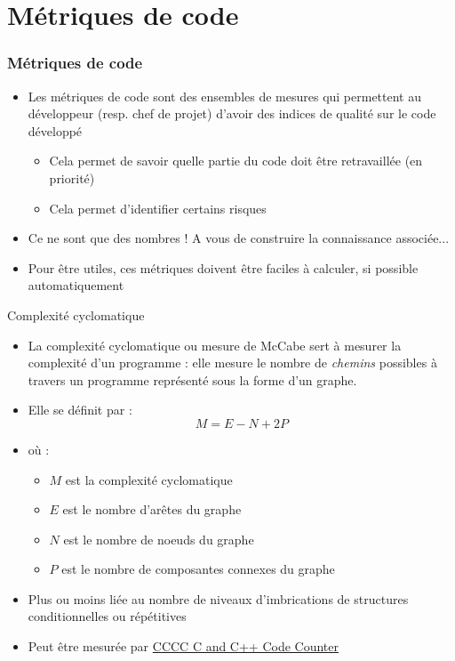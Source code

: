 \section{Métriques de code}

\begin{frame}
\frametitle{Métriques de code}
\begin{itemize}
\item Les métriques de code sont des ensembles de mesures qui permettent au développeur (resp. chef de projet) d'avoir des indices de qualité sur le code développé
\begin{itemize}
\item Cela permet de savoir quelle partie du code doit être retravaillée (en priorité)
\item Cela permet d'identifier certains risques
\end{itemize}
\item Ce ne sont que des nombres ! A vous de construire la connaissance associée...
\item Pour être utiles, ces métriques doivent être faciles à calculer, si possible automatiquement
\end{itemize}
\end{frame}


\begin{frame}{Complexité cyclomatique}
\begin{itemize}
\item La complexité cyclomatique ou mesure de McCabe sert à mesurer la complexité d'un programme : elle mesure le nombre de \textit{chemins} possibles à travers un programme représenté sous la forme d'un graphe.
\item Elle se définit par :
$$ M = E-N+2P$$
\item où :
\begin{itemize}
\item $M$ est la complexité cyclomatique
\item $E$ est le nombre d'arêtes du graphe
\item $N$ est le nombre de noeuds du graphe
\item $P$ est le nombre de composantes connexes du graphe
\end{itemize}
\item Plus ou moins liée au nombre de niveaux d'imbrications de structures conditionnelles ou répétitives
\item Peut être mesurée par \href{http://cccc.sourceforge.net}{CCCC C and C++ Code Counter} 
\end{itemize}
\end{frame}

